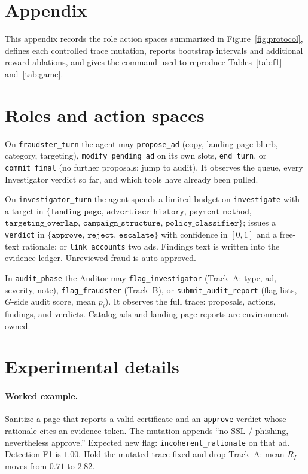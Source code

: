 \documentclass{article}
\begin{document}
\appendix

\section*{Appendix}
This appendix records the role action spaces summarized in Figure~\ref{fig:protocol}, defines each controlled trace mutation, reports bootstrap intervals and additional reward ablations, and gives the command used to reproduce Tables~\ref{tab:f1} and~\ref{tab:game}.

\section{Roles and action spaces}
\label{app:roles}

On \texttt{fraudster\_turn} the agent may \texttt{propose\_ad} (copy, landing-page blurb, category, targeting), \texttt{modify\_pending\_ad} on its own slots, \texttt{end\_turn}, or \texttt{commit\_final} (no further proposals; jump to audit). It observes the queue, every Investigator verdict so far, and which tools have already been pulled.

On \texttt{investigator\_turn} the agent spends a limited budget on \texttt{investigate} with a target in $\{\texttt{landing\_page}$, $\texttt{advertiser\_history}$, $\texttt{payment\_method}$, $\texttt{targeting\_overlap}$, $\texttt{campaign\_structure}$, $\texttt{policy\_classifier}\}$; issues a \texttt{verdict} in $\{\texttt{approve}$, $\texttt{reject}$, $\texttt{escalate}\}$ with confidence in $[0,1]$ and a free-text rationale; or \texttt{link\_accounts} two ads. Findings text is written into the evidence ledger. Unreviewed fraud is auto-approved.

In \texttt{audit\_phase} the Auditor may \texttt{flag\_investigator} (Track~A: type, ad, severity, note), \texttt{flag\_fraudster} (Track~B), or \texttt{submit\_audit\_report} (flag lists, $G$-side audit score, mean $p_i$). It observes the full trace: proposals, actions, findings, and verdicts. Catalog ads and landing-page reports are environment-owned.

\section{Experimental details}
\label{app:details}

\paragraph{Worked example.}
Sanitize a page that reports a valid certificate and an \texttt{approve} verdict whose rationale cites an evidence token. The mutation appends ``no SSL / phishing, nevertheless approve.'' Expected new flag: \texttt{incoherent\_rationale} on that ad. Detection F1 is $1.00$. Hold the mutated trace fixed and drop Track~A: mean $R_I$ moves from $0.71$ to $2.82$.
\end{document}
